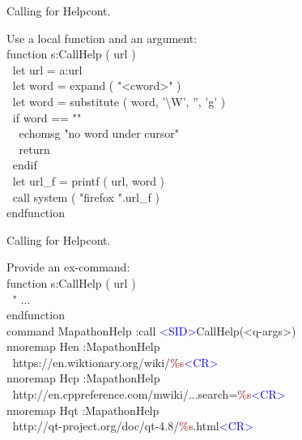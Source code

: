 \documentclass{beamer}
\newenvironment{mycode}[0]
{\ttfamily}
{}
\newcommand{\myind}[1]{\textcolor{white}{#1}}
\newcommand{\mycommt}[1]{\textcolor{comment}{#1}}
\newcommand{\myident}[1]{\textcolor{identifier}{#1}}
\newcommand{\mykeywd}[1]{\textcolor{keyword}{#1}}
\newcommand{\mystring}[1]{\textcolor{string}{#1}}
\newcommand{\myctrlkey}[1]{\textcolor{blue}{#1}}
\begin{document}
\begin{frame}{Calling for Help}{cont.}
\begin{overprint}
		Use a local function and an argument: \\[2mm]
		\begin{mycode}
			\mykeywd{function} s:CallHelp ( url ) \\[2mm]
%
			\myind{..}\mykeywd{let} url {} = \myident{a:url} \\
			\myind{..}\mykeywd{let} word = \myident{expand} ( \mystring{"<cword>"} ) \\
			\myind{..}\mykeywd{let} word = \myident{substitute} ( word, \mystring{'\textbackslash{}W'}, \mystring{''}, \mystring{'g'} ) \\[2mm]
%
			\myind{..}\mykeywd{if} word == \mystring{""} \\
			\myind{..}\myind{..}\mykeywd{echomsg} \mystring{"no word under cursor"} \\
			\myind{..}\myind{..}\mykeywd{return} \\
			\myind{..}\mykeywd{endif} \\[2mm]
%
			\myind{..}\mykeywd{let} url\_f = \myident{printf} ( url, word ) \\
			\myind{..}\mykeywd{call} \myident{system} ( \mystring{"firefox "}.url\_f ) \\
			\mykeywd{endfunction} \\
		\end{mycode}

	\end{overprint}

\end{frame}

\begin{frame}{Calling for Help}{cont.}

	Provide an ex-command: \\[2mm]
	\begin{mycode}
		\mykeywd{function} s:CallHelp ( url ) \\
		\myind{..}\mycommt{" ...} \\
		\mykeywd{endfunction} \\[3mm]

		\mykeywd{command} MapathonHelp :call \myctrlkey{<SID>}CallHelp(<q-args>) \\[3mm]

		\mykeywd{nnoremap} Hen :MapathonHelp \\
		\myind{..}https://en.wiktionary.org/wiki/\textcolor{darkred}{\%s}\myctrlkey{<CR>} \\
		\mykeywd{nnoremap} Hcp :MapathonHelp \\
		\myind{..}http://en.cppreference.com/mwiki/...search=\textcolor{darkred}{\%s}\myctrlkey{<CR>} \\
		\mykeywd{nnoremap} Hqt :MapathonHelp \\
		\myind{..}http://qt-project.org/doc/qt-4.8/\textcolor{darkred}{\%s}.html\myctrlkey{<CR>}
	\end{mycode}

\end{frame}
\end{document}
